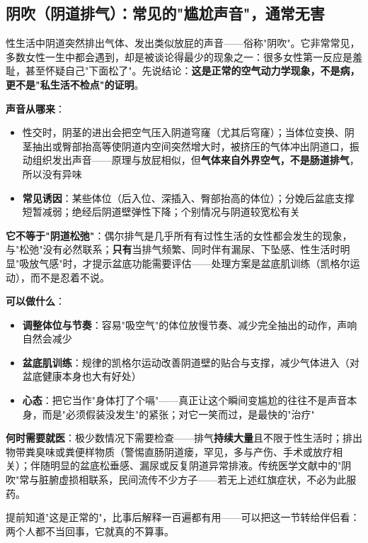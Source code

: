 \subsection{阴吹（阴道排气）：常见的"尴尬声音"，通常无害}

性生活中阴道突然排出气体、发出类似放屁的声音——俗称"阴吹"。它非常常见，多数女性一生中都会遇到，却是被谈论得最少的现象之一：很多女性第一反应是羞耻，甚至怀疑自己"下面松了"。先说结论：\textbf{这是正常的空气动力学现象，不是病，更不是"私生活不检点"的证明}。

\vspace{0.5em}
\noindent\textbf{声音从哪来}：

\begin{itemize}
	\item 性交时，阴茎的进出会把空气压入阴道穹窿（尤其后穹窿）；当体位变换、阴茎抽出或臀部抬高等使阴道内空间突然增大时，被挤压的气体冲出阴道口，振动组织发出声音——原理与放屁相似，但\textbf{气体来自外界空气，不是肠道排气}，所以没有异味
	\item \textbf{常见诱因}：某些体位（后入位、深插入、臀部抬高的体位）；分娩后盆底支撑短暂减弱；绝经后阴道壁弹性下降；个别情况与阴道较宽松有关
\end{itemize}

\vspace{0.5em}
\noindent\textbf{它不等于"阴道松弛"}：偶尔排气是几乎所有有过性生活的女性都会发生的现象，与"松弛"没有必然联系；\textbf{只有}当排气频繁、同时伴有漏尿、下坠感、性生活时明显"吸放气感"时，才提示盆底功能需要评估——处理方案是盆底肌训练（凯格尔运动），而不是忍着不说。

\vspace{0.5em}
\noindent\textbf{可以做什么}：

\begin{itemize}
	\item \textbf{调整体位与节奏}：容易"吸空气"的体位放慢节奏、减少完全抽出的动作，声响自然会减少
	\item \textbf{盆底肌训练}：规律的凯格尔运动改善阴道壁的贴合与支撑，减少气体进入（对盆底健康本身也大有好处）
	\item \textbf{心态}：把它当作"身体打了个嗝"——真正让这个瞬间变尴尬的往往不是声音本身，而是"必须假装没发生"的紧张；对它一笑而过，是最快的"治疗"
\end{itemize}

\vspace{0.5em}
\noindent\textbf{何时需要就医}：极少数情况下需要检查——排气\textbf{持续大量}且不限于性生活时；排出物带粪臭味或粪便样物质（警惕直肠阴道瘘，罕见，多与产伤、手术或放疗相关）；伴随明显的盆底松垂感、漏尿或反复阴道异常排液。传统医学文献中的"阴吹"常与脏腑虚损相联系，民间流传不少方子——若无上述红旗症状，不必为此服药。

\begin{tcolorbox}[colback=pink!5!white,colframe=red!50!black,title=贴心小叮咛]
提前知道"这是正常的"，比事后解释一百遍都有用——可以把这一节转给伴侣看：两个人都不当回事，它就真的不算事。
\end{tcolorbox}
